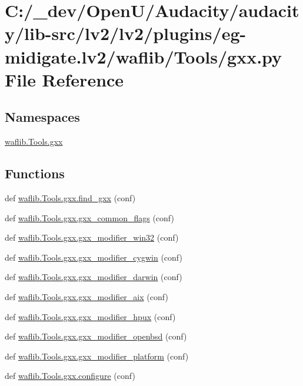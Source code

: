 \hypertarget{lv2_2plugins_2eg-midigate_8lv2_2waflib_2_tools_2gxx_8py}{}\section{C\+:/\+\_\+dev/\+Open\+U/\+Audacity/audacity/lib-\/src/lv2/lv2/plugins/eg-\/midigate.lv2/waflib/\+Tools/gxx.py File Reference}
\label{lv2_2plugins_2eg-midigate_8lv2_2waflib_2_tools_2gxx_8py}
\subsection*{Namespaces}
\begin{DoxyCompactItemize}
\item 
 \hyperlink{namespacewaflib_1_1_tools_1_1gxx}{waflib.\+Tools.\+gxx}
\end{DoxyCompactItemize}
\subsection*{Functions}
\begin{DoxyCompactItemize}
\item 
def \hyperlink{namespacewaflib_1_1_tools_1_1gxx_a429b712dd222e6e975da527c68c08ba8}{waflib.\+Tools.\+gxx.\+find\+\_\+gxx} (conf)
\item 
def \hyperlink{namespacewaflib_1_1_tools_1_1gxx_a86410b2f6bcf01791c43e27ddebf3080}{waflib.\+Tools.\+gxx.\+gxx\+\_\+common\+\_\+flags} (conf)
\item 
def \hyperlink{namespacewaflib_1_1_tools_1_1gxx_a5161aa30bcb691ffeb6b39da4b9b2b62}{waflib.\+Tools.\+gxx.\+gxx\+\_\+modifier\+\_\+win32} (conf)
\item 
def \hyperlink{namespacewaflib_1_1_tools_1_1gxx_a70609bea69338d82affec21284c6c5dc}{waflib.\+Tools.\+gxx.\+gxx\+\_\+modifier\+\_\+cygwin} (conf)
\item 
def \hyperlink{namespacewaflib_1_1_tools_1_1gxx_afb73b72b4db84fa412549484f754901e}{waflib.\+Tools.\+gxx.\+gxx\+\_\+modifier\+\_\+darwin} (conf)
\item 
def \hyperlink{namespacewaflib_1_1_tools_1_1gxx_aae0a6b0cc6273670e94d02a1601481ca}{waflib.\+Tools.\+gxx.\+gxx\+\_\+modifier\+\_\+aix} (conf)
\item 
def \hyperlink{namespacewaflib_1_1_tools_1_1gxx_a5862cdb93d3572914361f8f6261e8a18}{waflib.\+Tools.\+gxx.\+gxx\+\_\+modifier\+\_\+hpux} (conf)
\item 
def \hyperlink{namespacewaflib_1_1_tools_1_1gxx_a6915c3fe47d85e1eca7787adfc24e570}{waflib.\+Tools.\+gxx.\+gxx\+\_\+modifier\+\_\+openbsd} (conf)
\item 
def \hyperlink{namespacewaflib_1_1_tools_1_1gxx_a8ac4de3cf5a92e00e8c75e1272521afa}{waflib.\+Tools.\+gxx.\+gxx\+\_\+modifier\+\_\+platform} (conf)
\item 
def \hyperlink{namespacewaflib_1_1_tools_1_1gxx_aaf1ce44a59356fa376d25557d760bf6a}{waflib.\+Tools.\+gxx.\+configure} (conf)
\end{DoxyCompactItemize}
